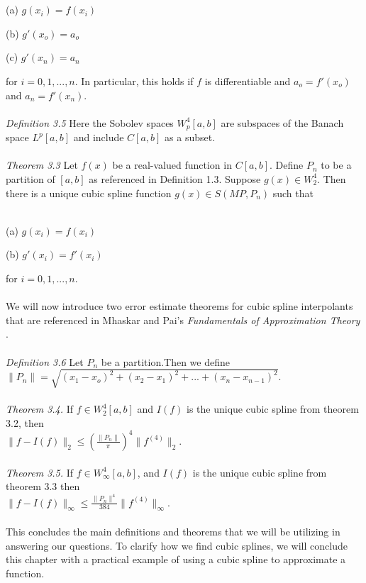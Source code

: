 \\\\
\centerline{(a) $g(x_{i})=f(x_{i})$} \newline
\centerline{(b) $g'(x_o)=a_o$} \newline
\centerline{(c) $g'(x_{n})=a_{n}$} \newline
for $i=0,1,...,n$. In particular, this holds if $f$ is differentiable and $a_{o} = f'(x_{o})$ and $a_{n} = f'(x_{n})$.
\\\\
\emph{Definition 3.5} \cite{key5} Here the Sobolev spaces $W^4_{p}[a,b]$ are subspaces of the Banach space $L^{p}[a,b]$ and include $C[a,b]$ as a subset.\\\\
\emph{Theorem 3.3} \cite[pg.~267]{key5} Let $f(x)$ be a real-valued function in $C[a,b]$. Define $P_{n}$ to be a partition of $[a,b]$ as referenced in Definition 1.3. Suppose $g(x) \in W^{4}_{2}$. Then there is a unique cubic spline function $g(x) \in S(MP, P_{n})$ such that
\\\\
\centerline{(a) $g(x_{i})=f(x_{i})$} \newline
\centerline{(b) $g'(x_{i})=f'(x_{i})$} \newline
for $i=0,1,...,n$.
\\\\
We will now introduce two error estimate theorems for cubic spline interpolants that are referenced in Mhaskar and Pai's \emph{Fundamentals of Approximation Theory} \cite[pg.~269]{key5}.
\\\\
\emph{Definition 3.6} Let $P_{n}$ be a partition.\newline Then we define $\|P_{n}\| = \sqrt{(x_{1}-x_{o})^2+(x_{2}-x_{1})^2+...+(x_{n}-x_{n-1})^2}$.\\\\
\emph{Theorem 3.4.} If $f \in W^{4}_{2}[a,b]$ and $I(f)$ is the unique cubic spline from theorem 3.2, then\\
$\|f-I(f)\|_{2} \leq (\frac{\|P_{n}\|}{\pi})^4\|f^{(4)}\|_{2}$.\\\\
\emph{Theorem 3.5.} If $f \in W^{4}_{\infty}[a,b]$, and $I(f)$ is the unique cubic spline from theorem 3.3 then\\
$\|f-I(f)\|_{\infty} \leq \frac{\|P_{n}\|^{4}}{384}\|f^{(4)}\|_{\infty}$.\\\\
This concludes the main definitions and theorems that we will be utilizing in answering our questions. To clarify how we find cubic splines, we will conclude this chapter with a practical example of using a cubic spline to approximate a function.

